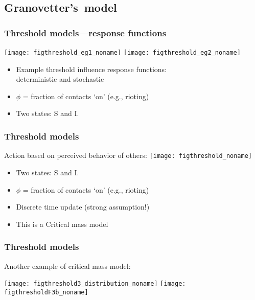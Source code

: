 

\subsection{Granovetter's\ model}

\begin{frame}
  \frametitle{Threshold models---response functions}

  \begin{block}{}
    \texttt{[image: figthreshold\_eg1\_noname]}
    \texttt{[image: figthreshold\_eg2\_noname]}\\

    \begin{itemize}
    \item<1-> Example threshold influence response functions:\\
      \alert{deterministic} and \alert{stochastic}
    \item<2-> $\phi$ = fraction of contacts `on' \alert{(e.g., rioting)}
    \item<3-> Two states: S and I.
    \end{itemize}
  \end{block}

\end{frame}

\begin{frame}
  \frametitle{Threshold models}

  \begin{block}{Action based on perceived behavior of others:}
    \texttt{[image: figthreshold\_noname]}
    \begin{itemize}
    \item<1-> Two states: S and I.
    \item<1-> $\phi$ = fraction of contacts `on' (e.g., rioting)
    \item<2-> Discrete time update (strong assumption!)
    \item<3-> This is a \alert{Critical mass model}
  \end{itemize}
  \end{block}

\end{frame}


\begin{frame}
   \frametitle{Threshold models}

   \begin{block}{ Another example of critical mass model:}
     \begin{center}
     \texttt{[image: figthreshold3\_distribution\_noname]}
     \texttt{[image: figthresholdF3b\_noname]}
     \end{center}
   \end{block}

\end{frame}

